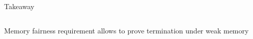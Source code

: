 \begin{frame}{Takeaway}
  

  \vspace{-0.5cm}
  
  \begin{columns}
    \begin{column}{0.4\linewidth}
      \scalebox{0.9}{\fairTrace}
    \end{column}    
    \begin{column}{0.4\linewidth}
      \renewcommand{\hof}{2}
      \renewcommand{\vof}{1}
      \scalebox{0.9}{
      \begin{tikzpicture}[xscale=2, yscale=0.9]
        \spinlockContraGraphEventsI
        \spinlockContraGraphRelationsI
        \spinlockContraGraphEventsII
        \spinlockContraGraphRelationsII
        \spinlockContraGraphContra
      \end{tikzpicture}
      }
    \end{column}    
  \end{columns}

  \vspace{0.5cm}
  \begin{center}
    Memory fairness requirement allows to prove termination under weak memory
  \end{center}



\end{frame}
